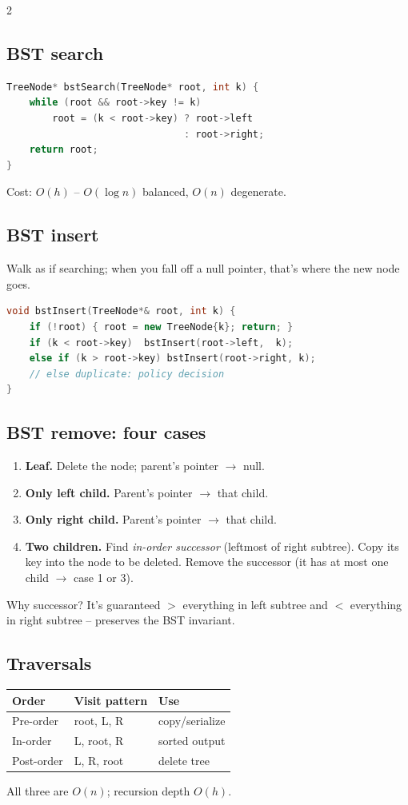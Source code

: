 \documentclass[10pt]{article}
\begin{document}
\begin{multicols}{2}
\subsection*{BST search}
\begin{lstlisting}[language=C++]
TreeNode* bstSearch(TreeNode* root, int k) {
    while (root && root->key != k)
        root = (k < root->key) ? root->left
                               : root->right;
    return root;
}
\end{lstlisting}
Cost: $O(h)$ -- $O(\log n)$ balanced, $O(n)$ degenerate.

\subsection*{BST insert}
Walk as if searching; when you fall off a null pointer, that's where
the new node goes.
\begin{lstlisting}[language=C++]
void bstInsert(TreeNode*& root, int k) {
    if (!root) { root = new TreeNode{k}; return; }
    if (k < root->key)  bstInsert(root->left,  k);
    else if (k > root->key) bstInsert(root->right, k);
    // else duplicate: policy decision
}
\end{lstlisting}

\columnbreak

\subsection*{BST remove: four cases}
\begin{enumerate}
    \item \textbf{Leaf.} Delete the node; parent's pointer $\to$ null.
    \item \textbf{Only left child.} Parent's pointer $\to$ that child.
    \item \textbf{Only right child.} Parent's pointer $\to$ that child.
    \item \textbf{Two children.} Find \emph{in-order successor}
    (leftmost of right subtree). Copy its key into the node to be
    deleted. Remove the successor (it has at most one child $\to$ case
    1 or 3).
\end{enumerate}
Why successor? It's guaranteed $>$ everything in left subtree and $<$
everything in right subtree -- preserves the BST invariant.

\subsection*{Traversals}
\begin{tabular}{@{}l|l|l@{}}
\textbf{Order}         & \textbf{Visit pattern}    & \textbf{Use}\\
\hline
Pre-order              & root, L, R               & copy/serialize\\
In-order               & L, root, R               & sorted output\\
Post-order             & L, R, root               & delete tree
\end{tabular}
All three are $O(n)$; recursion depth $O(h)$.


\end{multicols}
\end{document}
